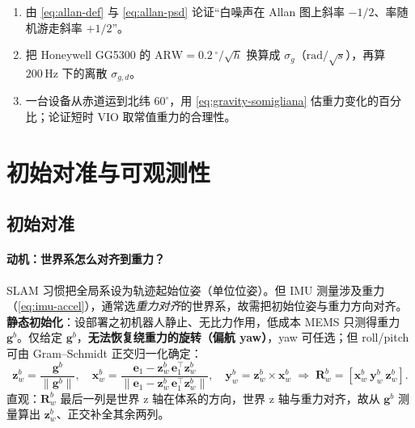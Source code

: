 \begin{practice}
\begin{enumerate}
  \item 由 \cref{eq:allan-def} 与 \cref{eq:allan-psd} 论证“白噪声在 Allan 图上斜率 $-1/2$、率随机游走斜率 $+1/2$”。
  \item 把 Honeywell GG5300 的 $\mathrm{ARW}=0.2\,^\circ/\sqrt h$ 换算成 $\sigma_g$（$\mathrm{rad}/\sqrt s$），再算 $200\,\mathrm{Hz}$ 下的离散 $\sigma_{g,d}$。
  \item 一台设备从赤道运到北纬 $60^\circ$，用 \cref{eq:gravity-somigliana} 估重力变化的百分比；论证短时 VIO 取常值重力的合理性。
\end{enumerate}
\end{practice}

\section{初始对准与可观测性}
\label{sec:imu-obs}

\subsection{初始对准}
\label{subsec:init-align}

\paragraph{动机：世界系怎么对齐到重力？}
SLAM 习惯把全局系设为轨迹起始位姿（单位位姿）。但 IMU 测量涉及重力（\cref{eq:imu-accel}），通常选\emph{重力对齐}的世界系，故需把初始位姿与重力方向对齐\cite{carlone2026handbook}。\textbf{静态初始化}：设部署之初机器人静止、无比力作用，低成本 MEMS 只测得重力 $\mathbf g^b$。仅给定 $\mathbf g^b$，\textbf{无法恢复绕重力的旋转（偏航 yaw）}，yaw 可任选；但 roll/pitch 可由 Gram--Schmidt 正交归一化确定：
\begin{equation}
  \mathbf z_w^b=\frac{\mathbf g^b}{\|\mathbf g^b\|},\quad
  \mathbf x_w^b=\frac{\mathbf e_1-\mathbf z_w^b\,\mathbf e_1^\top\mathbf z_w^b}{\|\mathbf e_1-\mathbf z_w^b\,\mathbf e_1^\top\mathbf z_w^b\|},\quad
  \mathbf y_w^b=\mathbf z_w^b\times\mathbf x_w^b
  \;\Rightarrow\;\mathbf R_w^b=[\mathbf x_w^b\ \mathbf y_w^b\ \mathbf z_w^b].
  \label{eq:static-align}
\end{equation}
直观：$\mathbf R_w^b$ 最后一列是世界 z 轴在体系的方向，世界 z 轴与重力对齐，故从 $\mathbf g^b$ 测量算出 $\mathbf z_w^b$、正交补全其余两列。

